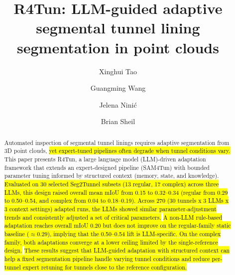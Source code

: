 \documentclass[a4paper,fleqn]{cas-dc}
\begin{document}
\let\WriteBookmarks\relax
\def\floatpagepagefraction{1}
\def\textpagefraction{.001}


{

\title[mode=title]{R4Tun: LLM-guided adaptive segmental tunnel lining segmentation in point clouds}

\author[1]{Xinghui Tao}

\author[1]{Guangming Wang}
\cormark[1]

\author[2]{Jelena Nini\'{c}}

\author[1]{Brian Sheil}





\begin{abstract}
Automated inspection of segmental tunnel linings requires adaptive segmentation from 3D point clouds, \hl{yet expert-tuned pipelines often degrade when tunnel conditions vary.} This paper presents R4Tun, a large language model (LLM)-driven adaptation framework that extends an expert-designed pipeline (SAM4Tun) with bounded parameter tuning informed by structured context (memory, state, and knowledge). \hl{Evaluated on 30 selected Seg2Tunnel subsets (13 regular, 17 complex) across three LLMs, this design raised overall mean mIoU from 0.15 to 0.32--0.34 (regular from 0.29 to 0.50--0.54, and complex from 0.04 to 0.18--0.19). Across 270 (30 tunnels x 3 LLMs x 3 context settings) adapted runs, the LLMs showed similar parameter-adjustment trends and consistently adjusted a set of critical parameters.} \hl{A non-LLM rule-based adaptation reaches overall mIoU 0.20 but does not improve on the regular-family static baseline ($\approx 0.29$), implying that the 0.50--0.54 lift is LLM-specific. On the complex family, both adaptations converge at a lower ceiling limited by the single-reference design.} \hl{These results suggest that LLM-guided adaptation with structured context can help a fixed segmentation pipeline handle varying tunnel conditions and reduce per-tunnel expert retuning for tunnels close to the reference configuration.}
\end{abstract}


}
\end{document}
